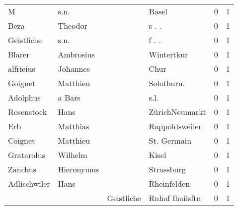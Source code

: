 \documentclass[10pt,a4paper,landscape]{article}
\begin{document}
\begin{longtable}{llllrr}
                        M &                               s.n. &             &                                       Basel &          0 &         1 \\
                     Beza &                            Theodor &             &                                      s . .  &          0 &         1 \\
               Geistliche &                               s.n. &             &                                      f . .  &          0 &         1 \\
                   Blarer &                          Ambrosius &             &                                  Wintertkur &          0 &         1 \\
                alfrieius &                           Johannes &             &                                        Chur &          0 &         1 \\
                  Goignet &                           Matthieu &             &                                 Solothurn.  &          0 &         1 \\
                 Adolphus &                             a Bars &             &                                        s.l. &          0 &         1 \\
               Rosenstock &                               Hans &             &                              ZürichNeumarkt &          0 &         1 \\
                      Erb &                           Matthias &             &                              Rappoldsweiler &          0 &         1 \\
                  Coignet &                           Matthieu &             &                                 St. Germain &          0 &         1 \\
               Gratarolus &                            Wilhelm &             &                                       Kisel &          0 &         1 \\
                  Zanchus &                         Hieronymus &             &                                  Strassburg &          0 &         1 \\
             Adlischwiler &                               Hans &             &                                 Rheinfelden &          0 &         1 \\
                          &                                    &  Geistliche &                             Rnhaf fhaiisftn &          0 &         1 \\

\end{longtable}
\end{document}
